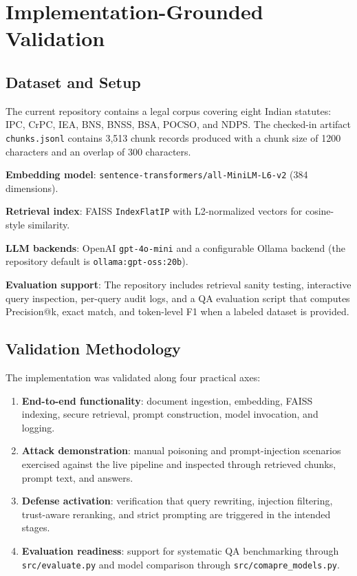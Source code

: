 \documentclass[conference]{IEEEtran}
\begin{document}
\section{Implementation-Grounded Validation}

\subsection{Dataset and Setup}

The current repository contains a legal corpus covering eight Indian statutes: IPC, CrPC, IEA, BNS, BNSS, BSA, POCSO, and NDPS. The checked-in artifact \texttt{chunks.jsonl} contains 3,513 chunk records produced with a chunk size of 1200 characters and an overlap of 300 characters.

\textbf{Embedding model}: \texttt{sentence-transformers/all-MiniLM-L6-v2} (384 dimensions).

\textbf{Retrieval index}: FAISS \texttt{IndexFlatIP} with L2-normalized vectors for cosine-style similarity.

\textbf{LLM backends}: OpenAI \texttt{gpt-4o-mini} and a configurable Ollama backend (the repository default is \texttt{ollama:gpt-oss:20b}).

\textbf{Evaluation support}: The repository includes retrieval sanity testing, interactive query inspection, per-query audit logs, and a QA evaluation script that computes Precision@k, exact match, and token-level F1 when a labeled dataset is provided.

\subsection{Validation Methodology}

The implementation was validated along four practical axes:
\begin{enumerate}
    \item \textbf{End-to-end functionality}: document ingestion, embedding, FAISS indexing, secure retrieval, prompt construction, model invocation, and logging.
    \item \textbf{Attack demonstration}: manual poisoning and prompt-injection scenarios exercised against the live pipeline and inspected through retrieved chunks, prompt text, and answers.
    \item \textbf{Defense activation}: verification that query rewriting, injection filtering, trust-aware reranking, and strict prompting are triggered in the intended stages.
    \item \textbf{Evaluation readiness}: support for systematic QA benchmarking through \texttt{src/evaluate.py} and model comparison through \texttt{src/comapre\_models.py}.
\end{enumerate}
\end{document}
